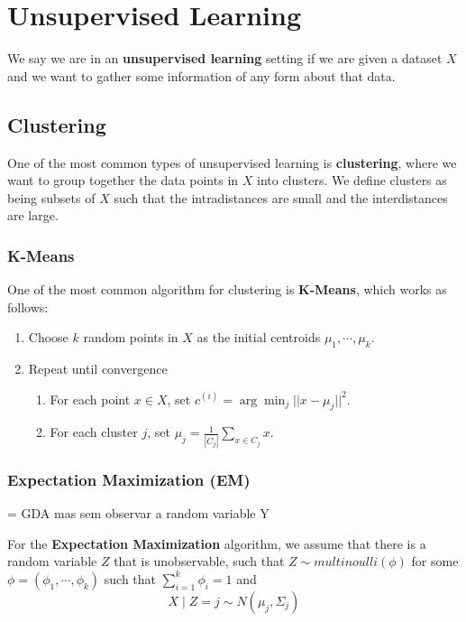 \documentclass{article}
\begin{document}
\section{Unsupervised Learning}

We say we are in an \textbf{unsupervised learning} setting if we are given a dataset $X$ and we want to gather some information of any form about that data.

\subsection{Clustering}

One of the most common types of unsupervised learning is \textbf{clustering}, where we want to group together the data points in $X$ into clusters.
We define clusters as being subsets of $X$ such that the intradistances are small and the interdistances are large.

\subsubsection{K-Means}

One of the most common algorithm for clustering is \textbf{K-Means}, which works as follows:
\begin{enumerate}
\item Choose $k$ random points in $X$ as the initial centroids $\mu_1, \cdots, \mu_k$.
\item Repeat until convergence
\begin{enumerate}
\item For each point $x \in X$, set $c^{(i)} = \arg\min_{j} ||x-\mu_j||^2$.
\item For each cluster $j$, set $\mu_j = \frac{1}{|C_j|} \sum_{x \in C_j} x$.
\end{enumerate}
\end{enumerate}

\subsubsection{Expectation Maximization (EM)}

= GDA mas sem observar a random variable Y

For the \textbf{Expectation Maximization} algorithm, we assume that there is a random variable $Z$ that is unobservable, such that $Z \sim multinoulli(\phi)$ for some $\phi = (\phi_1, \cdots, \phi_k)$ such that $\sum_{i=1}^k \phi_i = 1$ and 
$$
X \mid Z = j \sim N(\mu_j, \Sigma_j)
$$
\end{document}
